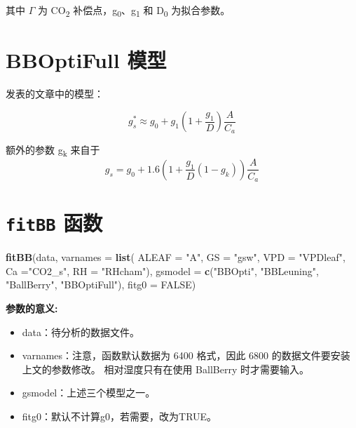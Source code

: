 \documentclass[
]{krantz}
\makeatletter
\newenvironment{Shaded}{\begin{snugshade}}{\end{snugshade}}
\newcommand{\DataTypeTok}[1]{\textcolor[rgb]{0.13,0.29,0.53}{#1}}
\newcommand{\KeywordTok}[1]{\textcolor[rgb]{0.13,0.29,0.53}{\textbf{#1}}}
\newcommand{\NormalTok}[1]{#1}
\newcommand{\OtherTok}[1]{\textcolor[rgb]{0.56,0.35,0.01}{#1}}
\newcommand{\StringTok}[1]{\textcolor[rgb]{0.31,0.60,0.02}{#1}}
\providecommand{\tightlist}{%
  \setlength{\itemsep}{0pt}\setlength{\parskip}{0pt}}
\newenvironment{kframe}{%
\medskip{}
\setlength{\fboxsep}{.8em}
 \def\at@end@of@kframe{}%
 \ifinner\ifhmode%
  \def\at@end@of@kframe{\end{minipage}}%
  \begin{minipage}{\columnwidth}%
 \fi\fi%
 \def\FrameCommand##1{\hskip\@totalleftmargin \hskip-\fboxsep
 \colorbox{shadecolor}{##1}\hskip-\fboxsep
     \hskip-\linewidth \hskip-\@totalleftmargin \hskip\columnwidth}%
 \MakeFramed {\advance\hsize-\width
   \@totalleftmargin\z@ \linewidth\hsize
   \@setminipage}}%
 {\par\unskip\endMakeFramed%
 \at@end@of@kframe}
\renewenvironment{Shaded}{\begin{kframe}}{\end{kframe}}
\makeatother
\begin{document}
其中 \(\Gamma\) 为 CO\textsubscript{2} 补偿点，g\textsubscript{0}、g\textsubscript{1} 和 D\textsubscript{0} 为拟合参数。

\hypertarget{bboptifull}{%
\section{BBOptiFull 模型}\label{bboptifull}}

\citet{Medlyn2011Reconciling} 发表的文章中的模型：

\begin{equation}
g_s^* \approx g_0 + g_1(1 + \frac{g_1}{D}) \frac{A}{C_a}
\label{eq:BBOptiFull}
\end{equation}

额外的参数 g\textsubscript{k} 来自于 \citet{Duursma2013Near}
\begin{equation}
g_s = g_0 + 1.6(1 + \frac{g_1}{D}(1-g_k)) \frac{A}{C_a}
\label{eq:Duursm}
\end{equation}

\hypertarget{fitbb-p}{%
\section{\texorpdfstring{\texttt{fitBB} 函数}{fitBB 函数}}\label{fitbb-p}}

\begin{Shaded}
\begin{Highlighting}[]
\KeywordTok{fitBB}\NormalTok{(data, }\DataTypeTok{varnames =} \KeywordTok{list}\NormalTok{(}
  \DataTypeTok{ALEAF =} \StringTok{"A"}\NormalTok{, }\DataTypeTok{GS =} \StringTok{"gsw"}\NormalTok{, }\DataTypeTok{VPD =} \StringTok{"VPDleaf"}\NormalTok{,}
  \DataTypeTok{Ca =}\StringTok{"CO2_s"}\NormalTok{, }\DataTypeTok{RH =} \StringTok{"RHcham"}\NormalTok{), }
  \DataTypeTok{gsmodel =} \KeywordTok{c}\NormalTok{(}\StringTok{"BBOpti"}\NormalTok{, }\StringTok{"BBLeuning"}\NormalTok{, }\StringTok{"BallBerry"}\NormalTok{,}
              \StringTok{"BBOptiFull"}\NormalTok{), }\DataTypeTok{fitg0 =} \OtherTok{FALSE}\NormalTok{)}
\end{Highlighting}
\end{Shaded}

\textbf{参数的意义:}

\begin{itemize}
\tightlist
\item
  data：待分析的数据文件。
\item
  varnames：注意，函数默认数据为 6400 格式，因此 6800 的数据文件要安装上文的参数修改。 相对湿度只有在使用 BallBerry 时才需要输入。
\item
  gsmodel：上述三个模型之一。
\item
  fitg0：默认不计算g0，若需要，改为TRUE。
\end{itemize}
\end{document}
